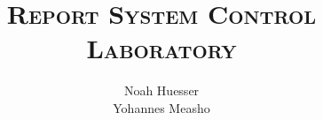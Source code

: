 \author{
  Noah Huesser\\
  Yohannes Measho
}

\title{
    \vspace{20mm}
    \Huge{\textsc{Report System Control Laboratory}}
}
